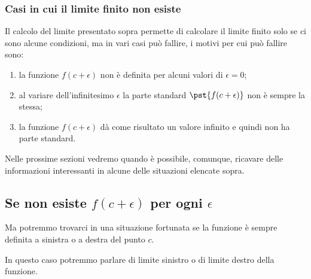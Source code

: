\subsubsection{Casi in cui il limite finito non esiste}
\label{subsubsec:cont_limiti_nonesiste}

Il calcolo del limite presentato sopra permette di calcolare il limite 
finito solo se ci sono alcune condizioni, ma in vari casi può fallire, 
i motivi per cui può fallire sono:
\begin{enumerate} [nosep]
\item la funzione \(f(c+\epsilon)\) non è definita per alcuni valori di 
\(\epsilon = 0\); 
\item al variare dell'infinitesimo \(\epsilon\) la parte standard 
\(\pst{f(c+\epsilon)}\) non è sempre la stessa;
\item la funzione \(f(c+\epsilon)\) dà come risultato un valore infinito e 
quindi non ha parte standard. 
\end{enumerate}

Nelle prossime sezioni vedremo quando è possibile, comunque, ricavare delle 
informazioni interessanti in alcune delle situazioni elencate sopra.

\subsection{Se non esiste \(f(c+\epsilon)\) per ogni \(\epsilon\)}
\label{subsec:cont_limiti_nonsempreesiste}


Ma potremmo trovarci in una situazione fortunata se la funzione è sempre 
definita a sinistra o a destra del punto \(c\).

In questo caso potremmo parlare di limite sinistro o di limite destro della 
funzione.


